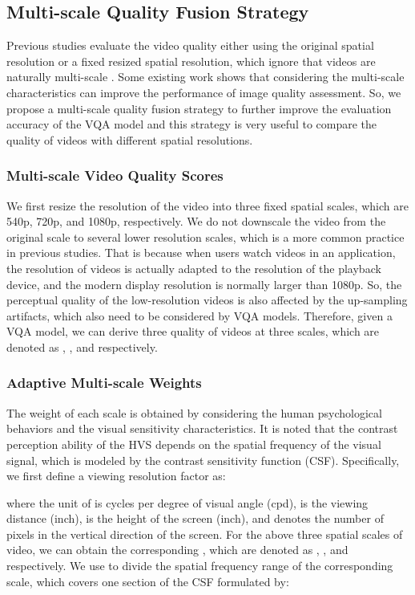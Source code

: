 \documentclass[sigconf]{acmart}
\begin{document}
\subsection{Multi-scale Quality Fusion Strategy}
Previous studies evaluate the video quality either using the original spatial resolution or a fixed resized spatial resolution, which ignore that videos are naturally multi-scale \cite{zheng2022faver}. Some existing work \cite{wang2003multiscale}\cite{rehman2015display}\cite{min2017unified} shows that considering the multi-scale characteristics can improve the performance of image quality assessment. So, we propose a multi-scale quality fusion strategy to further improve the evaluation accuracy of the VQA model and this strategy is very useful to compare the quality of videos with different spatial resolutions.
\subsubsection{Multi-scale Video Quality Scores}
We first resize the resolution of the video into three fixed spatial scales, which are 540p, 720p, and 1080p, respectively. We do not downscale the video from the original scale to several lower resolution scales, which is a more common practice in previous studies. That is because when users watch videos in an application, the resolution of videos is actually adapted to the resolution of the playback device, and the modern display resolution is normally larger than 1080p. So, the perceptual quality of the low-resolution videos is also affected by the up-sampling artifacts, which also need to be considered by VQA models. Therefore, given a VQA model, we can derive three quality of videos at three scales, which are denoted as , , and  respectively. 
\subsubsection{Adaptive Multi-scale Weights}
The weight of each scale is obtained by considering the human psychological behaviors and the visual sensitivity characteristics. It is noted that the contrast perception ability of the HVS depends on the spatial frequency of the visual signal, which is modeled by the contrast sensitivity function (CSF). Specifically, we first define a viewing resolution factor  as:

where the unit of  is cycles per degree of visual angle (cpd),  is the viewing distance (inch),  is the height of the screen (inch), and  denotes the number of pixels in the vertical direction of the screen. For the above three spatial scales of video, we can obtain the corresponding , which are denoted as , , and  respectively. We use  to divide the spatial frequency range of the corresponding scale, which covers one section of the CSF formulated by:
\end{document}

